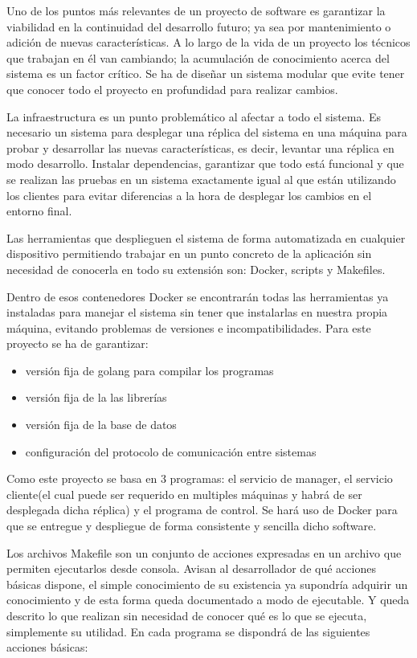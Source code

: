 
Uno de los puntos más relevantes de un proyecto de software es garantizar la viabilidad en la continuidad del desarrollo futuro;
ya sea por mantenimiento o adición de nuevas características.
A lo largo de la vida de un proyecto los técnicos que trabajan en él van cambiando;
la acumulación de conocimiento acerca del sistema es un factor crítico.
Se ha de diseñar un sistema modular que evite tener que conocer todo el proyecto en profundidad para realizar cambios.

La infraestructura es un punto problemático al afectar a todo el sistema.
Es necesario un sistema para desplegar una réplica del sistema en una máquina para probar y desarrollar las nuevas características, es decir, levantar una réplica en modo desarrollo.
Instalar dependencias, garantizar que todo está funcional y que se realizan las pruebas en un sistema exactamente igual al que están utilizando los clientes para evitar diferencias a la hora de desplegar los cambios en el entorno final.

Las herramientas que desplieguen el sistema de forma automatizada en cualquier dispositivo permitiendo trabajar en un punto concreto de la aplicación sin necesidad de conocerla en todo su extensión son: Docker, scripts y Makefiles.

Dentro de esos contenedores Docker se encontrarán todas las herramientas ya instaladas para manejar el sistema sin tener que instalarlas en nuestra propia máquina, evitando problemas de versiones e incompatibilidades.
Para este proyecto se ha de garantizar:

\begin{itemize}
    \item versión fija de golang para compilar los programas
    \item versión fija de la las librerías
    \item versión fija de la base de datos
    \item configuración del protocolo de comunicación entre sistemas
\end{itemize}

Como este proyecto se basa en 3 programas: el servicio de manager, el servicio cliente(el cual puede ser requerido en multiples máquinas y habrá de ser desplegada dicha réplica) y el programa de control.
Se hará uso de Docker para que se entregue y despliegue de forma consistente y sencilla dicho software.

Los archivos Makefile son un conjunto de acciones expresadas en un archivo que permiten ejecutarlos desde consola.
Avisan al desarrollador de qué acciones básicas dispone, el simple conocimiento de su existencia ya supondría adquirir un conocimiento y de esta forma queda documentado a modo de ejecutable.
Y queda descrito lo que realizan sin necesidad de conocer qué es lo que se ejecuta, simplemente su utilidad.
En cada programa se dispondrá de las siguientes acciones básicas:


